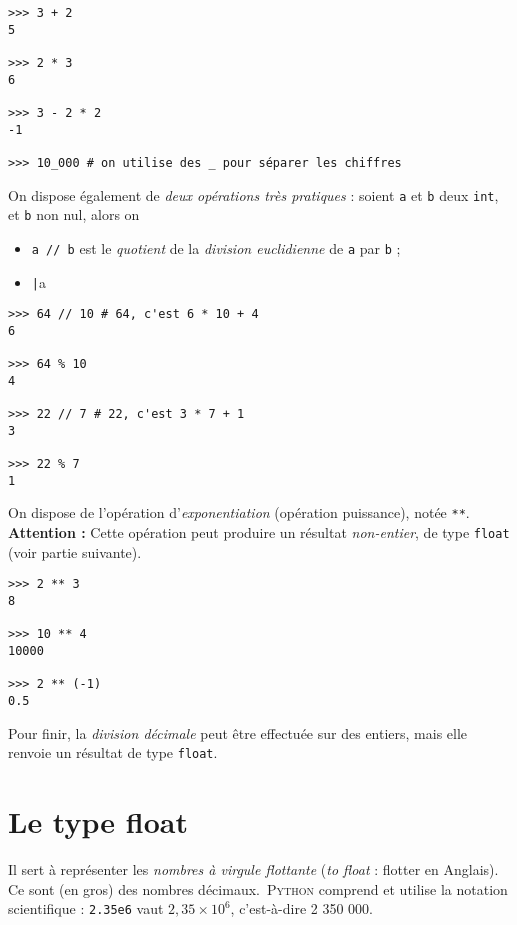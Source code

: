 \begin{pys}\begin{verbatim}
>>> 3 + 2
5

>>> 2 * 3
6

>>> 3 - 2 * 2
-1

>>> 10_000 # on utilise des _ pour séparer les chiffres
\end{verbatim}
\end{pys}

On dispose également de \textit{deux opérations très pratiques} : soient \texttt{a} et \texttt{b} deux \texttt{int}, et \texttt{b} non nul, alors on 
\begin{itemize}
  \item \texttt{a // b} est le \textit{quotient} de la \textit{division euclidienne} de \texttt{a} par \texttt{b} ;  
  \item \texttt|a %
\end{itemize}


\begin{pys}\begin{verbatim}
>>> 64 // 10 # 64, c'est 6 * 10 + 4
6

>>> 64 % 10
4

>>> 22 // 7 # 22, c'est 3 * 7 + 1
3

>>> 22 % 7
1
\end{verbatim}
\end{pys}


On dispose de l'opération d'\textit{exponentiation} (opération puissance), notée \texttt{**}.\\
\textbf{Attention :} Cette opération peut produire un résultat \textit{non-entier}, de type \texttt{float} (voir partie suivante).

\begin{pys}\begin{verbatim}
>>> 2 ** 3
8

>>> 10 ** 4
10000

>>> 2 ** (-1)
0.5
\end{verbatim}
\end{pys}

Pour finir, la \textit{division décimale} peut être effectuée sur des entiers, mais elle renvoie un résultat de type \texttt{float}.

\section{Le type float}
Il sert à représenter les \textit{nombres à virgule flottante} (\textit{to float} : flotter en Anglais). Ce sont (en gros) des nombres
décimaux.\ \textsc{Python} comprend et utilise la notation scientifique : \texttt{2.35e6} vaut $2,35\times 10^6$, c'est-à-dire 2 350 000.

